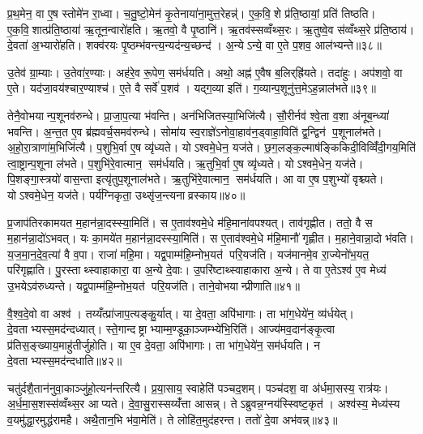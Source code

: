 प्र॒थ॒मेन॒ वा ए॒ष स्तोमे॑न रा॒ध्वा। च॒तु॒ष्टो॒मेन॑ कृ॒तेनाया॑ना॒मुत्त॒रेहन्न्॑। ए॒क॒वि॒शे प्र॑ति॒ष्ठायां॒ प्रति॑ तिष्ठति। ए॒क॒वि॒शात्प्र॑ति॒ष्ठाया॑ ऋ॒तून॒न्वारो॑हति। ऋ॒तवो॒ वै पृ॒ष्ठानि॑। ऋ॒तव॑स्सव्वँथ्स॒रः। ऋ॒तुष्वे॒व स॑व्वँथ्स॒रे प्र॑ति॒ष्ठाय॑। दे॒वता॑ अ॒भ्यारो॑हति। शक्व॑रयः पृ॒ष्ठम्भ॑वन्त्य॒न्यद॑न्य॒च्छन्द॑। अ॒न्येऽन्ये॒ वा ए॒ते प॒शव॒ आल॑भ्यन्ते॥३८॥

उ॒तेव॑ ग्रा॒म्याः। उ॒तेवा॑र॒ण्याः। अह॑रे॒व रू॒पेण॒ सम॑र्धयति। अथो॒ अह्न॑ ए॒वैष ब॒लिर्‌ह्रि॑यते। तदा॑हुः। अप॑शवो॒ वा ए॒ते। यद॑जा॒वय॑श्चार॒ण्याश्च॑। ए॒ते वै सर्वे॑ प॒शव॑। यद्ग॒व्या इति॑। ग॒व्यान्प॒शूनु॑त्त॒मेऽह॒न्नाल॑भते॥३९॥

तेनै॒वोभयान्प॒शूनव॑रुन्धे। प्रा॒जा॒प॒त्या भ॑वन्ति। अन॑भिजितस्या॒भिजि॑त्यै। सौ॒रीर्नव॑ श्वे॒ता व॒शा अ॑नूब॒न्ध्या॑ भवन्ति। अ॒न्त॒त ए॒व ब्र॑ह्मवर्च॒समव॑रुन्धे। सोमा॑य स्व॒राज्ञे॑ऽनोवा॒हाव॑न॒ड्वाहा॒विति॑ द्व॒न्द्विन॑ प॒शूनाल॑भते। अ॒हो॒रा॒त्राणा॑म॒भिजि॑त्यै। प॒शुभि॒र्वा ए॒ष व्यृ॑ध्यते। योऽश्वमे॒धेन॒ यज॑ते। छ॒ग॒लङ्क॒ल्माष॑ङ्किकिदी॒विव्विँ॑दी॒गय॒मिति॑ त्वा॒ष्ट्रान्प॒शूना ल॑भते। प॒शुभि॑रे॒वात्मान॒ सम॑र्धयति। ऋ॒तुभि॒र्वा ए॒ष व्यृ॑ध्यते। योऽश्वमे॒धेन॒ यज॑ते। पि॒शङ्गा॒स्त्रयो॑ वास॒न्ता इत्यृ॑तुप॒शूनाल॑भते। ऋ॒तुभि॑रे॒वात्मान॒ सम॑र्धयति। आ वा ए॒ष प॒शुभ्यो॑ वृश्च्यते। योऽश्वमे॒धेन॒ यज॑ते। पर्य॑ग्निकृता॒ उथ्सृ॑ज॒न्त्यनाव्रस्काय॥४०॥\anuvakamend[ल॒भ्य॒न्ते॒ ल॒भ॒ते॒ त्वा॒ष्ट्रान्प॒शूनाल॑भते॒ऽष्टौ च॑]

प्र॒जाप॑तिरकामयत म॒हान॑न्ना॒दस्स्या॒मिति॑। स ए॒ताव॑श्वमे॒धे म॑हि॒माना॑वपश्यत्। ताव॑गृह्णीत। ततो॒ वै स म॒हान॑न्ना॒दो॑ऽभवत्। यः का॒मये॑त म॒हान॑न्ना॒दस्स्या॒मिति॑। स ए॒ताव॑श्वमे॒धे म॑हि॒मानौ॑ गृह्णीत। म॒हाने॒वान्ना॒दो भ॑वति। य॒ज॒मा॒न॒दे॒व॒त्या॑ वै व॒पा। राजा॑ महि॒मा। यद्व॒पाम्म॑हि॒म्नोभ॒यत॑ परि॒यज॑ति। यज॑मानमे॒व रा॒ज्येनो॑भ॒यत॒ परि॑गृह्णाति। पु॒रस्ताथ्स्वाहाकारा॒ वा अ॒न्ये दे॒वाः। उ॒परि॑ष्टाथ्स्वाहाकारा अ॒न्ये। ते वा ए॒तेऽश्व॑ ए॒व मेध्य॑ उ॒भयेऽव॑रुध्यन्ते। यद्व॒पाम्म॑हि॒म्नोभ॒यत॑ परि॒यज॑ति। ताने॒वोभयान्प्रीणाति॥४१॥\anuvakamend[प॒रि॒यज॑ति॒ षट्च॑]

वै॒श्व॒दे॒वो वा अश्व॑। तय्यँत्प्रा॑जाप॒त्यङ्कु॒र्यात्। या दे॒वता॒ अपि॑भागाः। ता भा॑ग॒धेये॑न॒ व्य॑र्धयेत्। दे॒वताभ्यस्स॒मद॑न्दध्यात्। स्ते॒गान्दष्ट्राभ्याम्म॒ण्डूका॒ञ्जम्भ्ये॑भि॒रिति॑। आज्य॑मव॒दान॑ङ्कृ॒त्वा प्र॑तिस॒ङ्ख्याय॒माहु॑तीर्जुहोति। या ए॒व दे॒वता॒ अपि॑भागाः। ता भा॑ग॒धेये॑न॒ सम॑र्धयति। न दे॒वताभ्यस्स॒मद॑न्दधाति॥४२॥

चतु॑र्दशै॒तान॑नुवा॒काञ्जु॑हो॒त्यन॑न्तरित्यै। प्र॒या॒साय॒ स्वाहेति॑ पञ्चद॒शम्। पञ्च॑दश॒ वा अ॑र्धमा॒सस्य॒ रात्र॑यः। अ॒र्ध॒मा॒स॒शस्स॑व्वँथ्स॒र आप्यते। दे॒वा॒सु॒रास्सय्यँ॑त्ता आसन्न्। तेऽब्रुवन्न॒ग्नय॑स्स्विष्ट॒कृत॑। अश्व॑स्य॒ मेध्य॑स्य व॒यमु॑द्धा॒रमुद्ध॑रामहै। अथै॒तान॒भि भ॑वा॒मेति॑। ते लोहि॑त॒मुद॑हरन्त। ततो॑ दे॒वा अभ॑वन्न्॥४३॥

